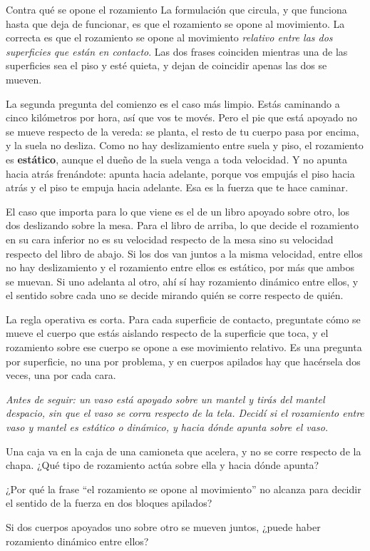 \documentclass[11pt,openany]{book}
\begin{document}
\begin{bloque}{Contra qué se opone el rozamiento}
La formulación que circula, y que funciona hasta que deja de funcionar, es que el rozamiento se opone al movimiento. La correcta es que el rozamiento se opone al movimiento \emph{relativo entre las dos superficies que están en contacto}. Las dos frases coinciden mientras una de las superficies sea el piso y esté quieta, y dejan de coincidir apenas las dos se mueven.

La segunda pregunta del comienzo es el caso más limpio. Estás caminando a cinco kilómetros por hora, así que vos te movés. Pero el pie que está apoyado no se mueve respecto de la vereda: se planta, el resto de tu cuerpo pasa por encima, y la suela no desliza. Como no hay deslizamiento entre suela y piso, el rozamiento es \textbf{estático}, aunque el dueño de la suela venga a toda velocidad. Y no apunta hacia atrás frenándote: apunta hacia adelante, porque vos empujás el piso hacia atrás y el piso te empuja hacia adelante. Esa es la fuerza que te hace caminar.

El caso que importa para lo que viene es el de un libro apoyado sobre otro, los dos deslizando sobre la mesa. Para el libro de arriba, lo que decide el rozamiento en su cara inferior no es su velocidad respecto de la mesa sino su velocidad respecto del libro de abajo. Si los dos van juntos a la misma velocidad, entre ellos no hay deslizamiento y el rozamiento entre ellos es estático, por más que ambos se muevan. Si uno adelanta al otro, ahí sí hay rozamiento dinámico entre ellos, y el sentido sobre cada uno se decide mirando quién se corre respecto de quién.

La regla operativa es corta. Para cada superficie de contacto, preguntate cómo se mueve el cuerpo que estás aislando respecto de la superficie que toca, y el rozamiento sobre ese cuerpo se opone a ese movimiento relativo. Es una pregunta por superficie, no una por problema, y en cuerpos apilados hay que hacérsela dos veces, una por cada cara.

\textit{Antes de seguir: un vaso está apoyado sobre un mantel y tirás del mantel despacio, sin que el vaso se corra respecto de la tela. Decidí si el rozamiento entre vaso y mantel es estático o dinámico, y hacia dónde apunta sobre el vaso.}
\end{bloque}

\begin{chequeo}
\item Una caja va en la caja de una camioneta que acelera, y no se corre respecto de la chapa. ¿Qué tipo de rozamiento actúa sobre ella y hacia dónde apunta?
\item ¿Por qué la frase ``el rozamiento se opone al movimiento'' no alcanza para decidir el sentido de la fuerza en dos bloques apilados?
\item Si dos cuerpos apoyados uno sobre otro se mueven juntos, ¿puede haber rozamiento dinámico entre ellos?
\end{chequeo}
\end{document}
